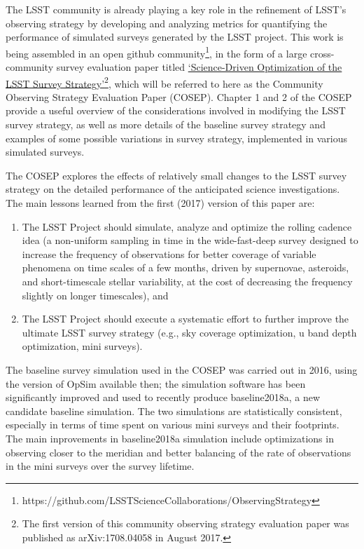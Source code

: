 \documentclass[DM,toc,usenatbib]{lsstdoc}
\begin{document}
The LSST community is already playing a key role in the refinement of LSST's observing strategy 
by developing and analyzing metrics for quantifying the performance of simulated surveys generated by
the LSST project.  This work is being assembled in an open github community\footnote{
https://github.com/LSSTScienceCollaborations/ObservingStrategy}, 
in the form of a large cross-community survey evaluation paper
titled \href{http://ls.st/9fw}{`Science-Driven Optimization of the LSST Survey Strategy'}\footnote{The first 
version of this community observing strategy evaluation paper was published as arXiv:1708.04058 in August 2017.},
which will be referred to here as the Community Observing Strategy Evaluation Paper (COSEP). 
Chapter 1 and 2 of the COSEP provide a useful overview of the considerations involved in 
modifying the LSST survey strategy, as well as more details of the baseline survey strategy and 
examples of some possible variations in survey strategy, implemented in various simulated surveys.

The COSEP explores the effects of relatively small changes to the LSST survey strategy
on the detailed performance of the anticipated science investigations. The main lessons 
learned from the first (2017) version of this paper are: 
\begin{enumerate} 
\item The LSST Project should simulate, analyze and optimize the rolling cadence idea
(a non-uniform sampling in time in the wide-fast-deep survey designed to increase the frequency of 
observations for better coverage of variable phenomena on time scales of a few months, driven 
by supernovae, asteroids, and short-timescale stellar variability, at the cost of decreasing the 
frequency slightly on longer timescales), and 
\item The LSST Project should execute a systematic effort to further improve the ultimate
LSST survey strategy (e.g., sky coverage optimization, u band depth optimization, mini surveys). 
\end{enumerate} 
The baseline survey simulation used in the COSEP was carried out in 2016, using the version of
OpSim available then; the simulation software has been significantly improved and used to recently
produce baseline2018a, a new candidate baseline simulation. The two simulations are statistically consistent,
especially in terms of time spent on various mini surveys and their footprints. The main inprovements
in baseline2018a simulation include optimizations in observing closer to the meridian and better 
balancing of the rate of observations in the mini surveys over the survey lifetime.
\end{document}

